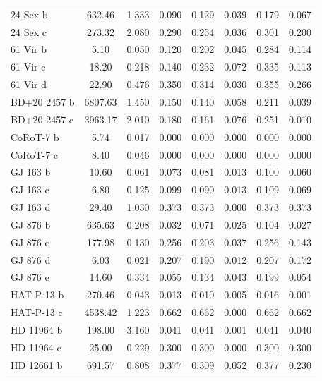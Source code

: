 \documentclass[11pt, oneside]{article}   	%
\begin{document}
\begin{longtable}{|l|c|c|c|c|c|c|c|}
\hline
24 Sex b      & 632.46  & 1.333 & 0.090   & 0.129   & 0.039  & 0.179  & 0.067  \\ 
24 Sex c      & 273.32  & 2.080 & 0.290   & 0.254   & 0.036  & 0.301  & 0.200  \\ \hline
61 Vir b      & 5.10    & 0.050 & 0.120   & 0.202   & 0.045  & 0.284  & 0.114  \\ 
61 Vir c      & 18.20   & 0.218 & 0.140   & 0.232   & 0.072  & 0.335  & 0.113  \\ 
61 Vir d      & 22.90   & 0.476 & 0.350   & 0.314   & 0.030  & 0.355  & 0.266  \\ \hline
BD+20 2457 b  & 6807.63 & 1.450 & 0.150   & 0.140   & 0.058  & 0.211  & 0.039  \\ 
BD+20 2457 c  & 3963.17 & 2.010 & 0.180   & 0.161   & 0.076  & 0.251  & 0.010  \\ \hline
CoRoT-7 b     & 5.74    & 0.017 & 0.000   & 0.000   & 0.000  & 0.000  & 0.000  \\ 
CoRoT-7 c     & 8.40    & 0.046 & 0.000   & 0.000   & 0.000  & 0.000  & 0.000  \\ \hline
GJ 163 b      & 10.60   & 0.061 & 0.073   & 0.081   & 0.013  & 0.100  & 0.060  \\ 
GJ 163 c      & 6.80    & 0.125 & 0.099   & 0.090   & 0.013  & 0.109  & 0.069  \\ 
GJ 163 d      & 29.40   & 1.030 & 0.373   & 0.373   & 0.000  & 0.373  & 0.373  \\ \hline
GJ 876 b      & 635.63  & 0.208 & 0.032   & 0.071   & 0.025  & 0.104  & 0.027  \\ 
GJ 876 c      & 177.98  & 0.130 & 0.256   & 0.203   & 0.037  & 0.256  & 0.143  \\ 
GJ 876 d      & 6.03    & 0.021 & 0.207   & 0.190   & 0.012  & 0.207  & 0.172  \\ 
GJ 876 e      & 14.60   & 0.334 & 0.055   & 0.134   & 0.043  & 0.199  & 0.054  \\ \hline
HAT-P-13 b    & 270.46  & 0.043 & 0.013   & 0.010   & 0.005  & 0.016  & 0.001  \\ 
HAT-P-13 c    & 4538.42 & 1.223 & 0.662   & 0.662   & 0.000  & 0.662  & 0.662  \\ \hline
HD 11964 b    & 198.00  & 3.160 & 0.041   & 0.041   & 0.001  & 0.041  & 0.040  \\ 
HD 11964 c    & 25.00   & 0.229 & 0.300   & 0.300   & 0.000  & 0.300  & 0.300  \\ \hline
HD 12661 b    & 691.57  & 0.808 & 0.377   & 0.309   & 0.052  & 0.377  & 0.230  \\ 

\end{longtable}
\end{document}
